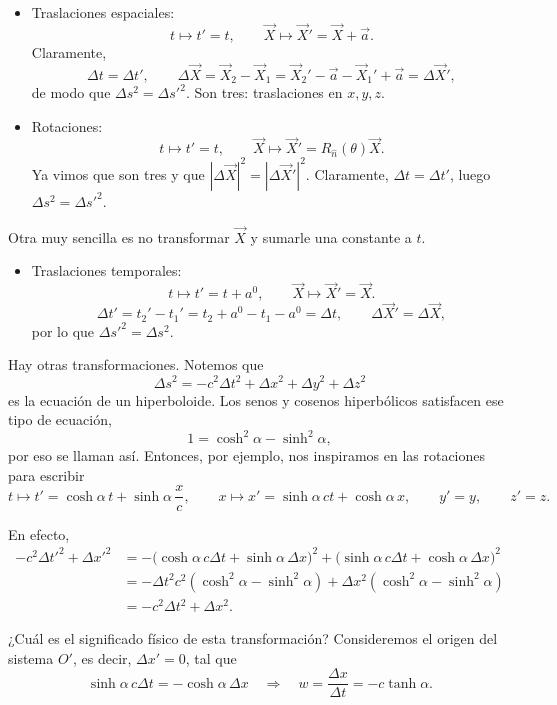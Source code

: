 \documentclass[11pt,a4paper]{article}
\begin{document}
\begin{itemize}
  \item Traslaciones espaciales:
  \[
    t\mapsto t'=t,
    \qquad
    \vec X\mapsto\vec X'=\vec X+\vec a.
  \]
  Claramente,
  \[
    \Delta t=\Delta t',
    \qquad
    \Delta\vec X
    =\vec X_2-\vec X_1
    =\vec X_2'-\vec a-\vec X_1'+\vec a
    =\Delta\vec X',
  \]
  de modo que $\Delta s^2=\Delta s'^2$. Son tres: traslaciones en $x,y,z$.

  \item Rotaciones:
  \[
    t\mapsto t'=t,
    \qquad
    \vec X\mapsto\vec X'=R_{\hat n}(\theta)\vec X.
  \]
  Ya vimos que son tres y que $|\Delta\vec X|^2=|\Delta\vec X'|^2$.
  Claramente, $\Delta t=\Delta t'$, luego $\Delta s^2=\Delta s'^2$.
\end{itemize}

Otra muy sencilla es no transformar $\vec X$ y sumarle una constante a $t$.

\begin{itemize}
  \item Traslaciones temporales:
  \[
    t\mapsto t'=t+a^0,
    \qquad
    \vec X\mapsto\vec X'=\vec X.
  \]
  \[
    \Delta t'=t_2'-t_1'=t_2+a^0-t_1-a^0=\Delta t,
    \qquad
    \Delta\vec X'=\Delta\vec X,
  \]
  por lo que $\Delta s'^2=\Delta s^2$.
\end{itemize}

Hay otras transformaciones. Notemos que
\[
  \Delta s^2=-c^2\Delta t^2+\Delta x^2+\Delta y^2+\Delta z^2
\]
es la ecuación de un hiperboloide. Los senos y cosenos hiperbólicos satisfacen ese tipo de ecuación,
\[
  1=\cosh^2\alpha-\sinh^2\alpha,
\]
por eso se llaman así. Entonces, por ejemplo, nos inspiramos en las rotaciones para escribir
\[
  t\mapsto t'=\cosh\alpha\,t+\sinh\alpha\,\frac{x}{c},
  \qquad
  x\mapsto x'=\sinh\alpha\,ct+\cosh\alpha\,x,
  \qquad
  y'=y,
  \qquad
  z'=z.
\]

En efecto,
\begin{align*}
  -c^2\Delta t'^2+\Delta x'^2
  &=-\bigl(\cosh\alpha\,c\Delta t+\sinh\alpha\,\Delta x\bigr)^2
    +\bigl(\sinh\alpha\,c\Delta t+\cosh\alpha\,\Delta x\bigr)^2 \\
  &=-\Delta t^2c^2(\cosh^2\alpha-\sinh^2\alpha)
    +\Delta x^2(\cosh^2\alpha-\sinh^2\alpha) \\
  &=-c^2\Delta t^2+\Delta x^2.
\end{align*}

¿Cuál es el significado físico de esta transformación? Consideremos el origen del sistema $O'$, es decir, $\Delta x'=0$, tal que
\[
  \sinh\alpha\,c\Delta t=-\cosh\alpha\,\Delta x
  \quad\Longrightarrow\quad
  w=\frac{\Delta x}{\Delta t}=-c\tanh\alpha.
\]
\end{document}
